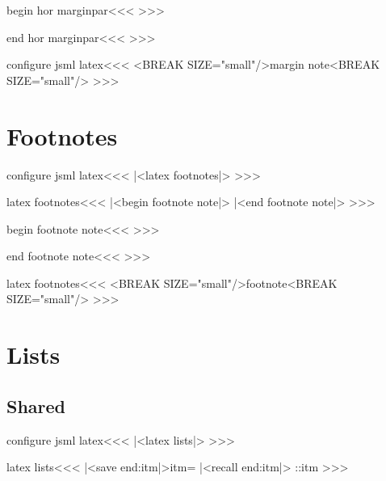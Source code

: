 \<begin hor marginpar\><<<
%
>>>

\<end hor marginpar\><<<
%
>>>



\<configure jsml latex\><<<
   {<BREAK SIZE="small"/>margin note<BREAK SIZE="small"/>}
   {}
>>>







\section{Footnotes}


\<configure jsml latex\><<<
|<latex footnotes|>
>>>

\<latex footnotes\><<<
   {|<begin footnote note|>}
   {|<end footnote note|>}  
>>>



\<begin footnote note\><<<
%
>>>


\<end footnote note\><<<
\HCode{}%
>>>


\<latex footnotes\><<<
   { <BREAK SIZE="small"/>footnote<BREAK SIZE="small"/>}
>>>





\section{Lists}

\subsection{Shared}




\<configure jsml latex\><<<
|<latex lists|>
>>>

\<latex lists\><<<
%
   {\EndP{}%
       |<save end:itm|>\global\let\end:itm=\empty}
   {|<recall end:itm|>\EndP{}\ShowPar}
   {\end:itm \global\def\end:itm{\EndP\Tg</dd>}\bgroup \bf}
   {\egroup{}}
>>>

